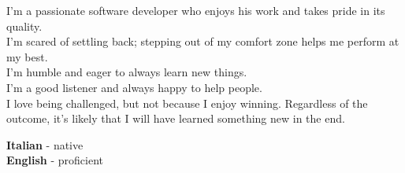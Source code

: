 \documentclass[9pt]{developercv} %
\begin{document}
\vspace{1.2cm}


\begin{minipage}[t]{0.4\textwidth} %
	\vspace{-\baselineskip} %


    I'm a passionate software developer who enjoys his work and takes pride in its quality.
    \\
    I'm scared of settling back; stepping out of my comfort zone helps me perform at my best.
    \\
    I'm humble and eager to always learn new things.
    \\
    I'm a good listener and always happy to help people.
    \\
    I love being challenged, but not because I enjoy winning. Regardless of the outcome,
    it's likely that I will have learned something new in the end.
\end{minipage}
\hfill %
\begin{minipage}[t]{0.5\textwidth} %
	\vspace{-\baselineskip} %

	
	\textbf{Italian} - native\\
	\textbf{English} - proficient

    \vspace{1.2cm}


    \begin{center}
         \vspace{0.3cm}
    \end{center}
\end{minipage}

\end{document}
